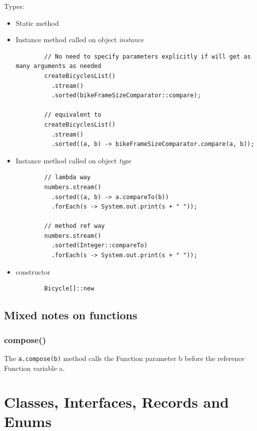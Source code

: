 \documentclass{scrartcl}
\begin{document}
    Types:
    \begin{itemize}
        \item Static method
        \item Instance method called on object \textit{instance}

        \begin{lstlisting}
        // No need to specify parameters explicitly if will get as many arguments as needed
        createBicyclesList()
          .stream()
          .sorted(bikeFrameSizeComparator::compare);

        // equivalent to
        createBicyclesList()
          .stream()
          .sorted((a, b) -> bikeFrameSizeComparator.compare(a, b));
        \end{lstlisting}

        \item Instance method called on object \textit{type}

        \begin{lstlisting}
        // lambda way
        numbers.stream()
          .sorted((a, b) -> a.compareTo(b))
          .forEach(s -> System.out.print(s + " "));

        // method ref way
        numbers.stream()
          .sorted(Integer::compareTo)
          .forEach(s -> System.out.print(s + " "));
        \end{lstlisting}

        \item  constructor

        \begin{lstlisting}
        Bicycle[]::new
        \end{lstlisting}

    \end{itemize}

\subsection{Mixed notes on functions}
\subsubsection{compose()}

    The \lstinline{a.compose(b)} method calls the Function parameter b before the reference Function variable a.


\section{Classes, Interfaces, Records and Enums}
\end{document}
